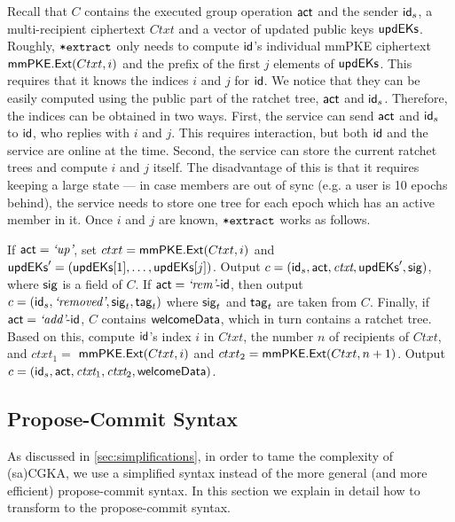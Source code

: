 

Recall that $C$ contains the executed group operation $\mathsf{act}$ and the sender ${\mathsf{id}}_s$, a multi-recipient ciphertext $Ctxt$ and a vector of updated public keys ${\mathsf{updEKs}}$. Roughly, ${\textnormal{\tt*extract}}$ only needs to compute ${\mathsf{id}}$'s individual mmPKE ciphertext ${\mathsf{mmPKE}}.{\mathsf{Ext}}(Ctxt, i)$ and the prefix of the first $j$ elements of ${\mathsf{updEKs}}$. This requires that it knows the indices $i$ and $j$ for ${\mathsf{id}}$.
%
We notice that they can be easily computed using the public part of the ratchet tree, $\mathsf{act}$ and ${\mathsf{id}}_s$. Therefore, the indices can be obtained in two ways. First, the service can send $\mathsf{act}$ and ${\mathsf{id}}_s$ to ${\mathsf{id}}$, who replies with $i$ and $j$.  This requires interaction, but both ${\mathsf{id}}$ and the service are online at the time. Second, the service can store the current ratchet trees and compute $i$ and $j$ itself. The disadvantage of this is that it requires keeping a large state --- in case members are out of sync (e.g. a user is 10 epochs behind), the service needs to store one tree for each epoch which has an active member in it.
%
Once $i$ and $j$ are known, ${\textnormal{\tt*extract}}$ works as follows.

If $\mathsf{act} = {\text{\normalfont \it`up'}}$, set  $ctxt = {\mathsf{mmPKE}}.{\mathsf{Ext}}(Ctxt, i)$ and ${\mathsf{updEKs}}' = ({\mathsf{updEKs}}[1], \dots, {\mathsf{updEKs}}[j])$. Output $c =  ({\mathsf{id}}_s, \mathsf{act}, {\normalfont\textit{ctxt}},\allowbreak  {\ensuremath{\mathsf{updEKs}}}',\allowbreak  {\ensuremath{\mathsf{sig}}})$, where ${\mathsf{sig}}$ is a field of $C$. If $\mathsf{act} = {\text{\normalfont \it`rem'}}\textrm{-}{\ensuremath{\mathsf{id}}}$, then output $c =  ({\mathsf{id}}_s, {\text{\normalfont \it`removed'}}, {\mathsf{sig}}_t, {\mathsf{tag}}_t)$ where $ {\mathsf{sig}}_t$ and ${\mathsf{tag}}_t$ are taken from $C$. Finally, if $\mathsf{act} = {\text{\normalfont \it`add'}}\textrm{-}{\ensuremath{\mathsf{id}}}$, $C$ contains $\textnormal{\textsf{welcomeData}}$, which in turn contains a ratchet tree. Based on this, compute ${\mathsf{id}}$'s index $i$ in $Ctxt$,  the number $n$ of recipients of $Ctxt$, and $ctxt_1 = $ ${\mathsf{mmPKE}}.{\mathsf{Ext}}(Ctxt, i)$ and $ctxt_2 = {\mathsf{mmPKE}}.{\mathsf{Ext}}(Ctxt, n+1)$. Output $c =  ({\mathsf{id}}_s, \mathsf{act}, {\normalfont\textit{ctxt}}_1,\allowbreak  {\normalfont\textit{ctxt}}_2,\allowbreak  \textnormal{\textsf{welcomeData}})$.

\subsection{Propose-Commit Syntax}
As discussed in \cref{sec:simplifications}, in order to tame the complexity of (sa)CGKA, we use a simplified syntax instead of the more general (and more efficient) propose-commit syntax. In this section we explain in detail how to transform \saik to the propose-commit syntax.

